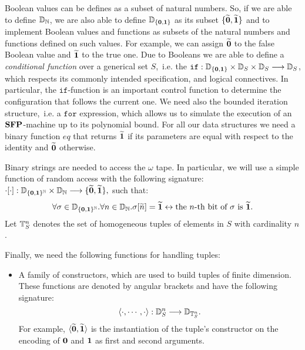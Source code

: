 \begin{conditional}{\appendixorsup}
  Boolean values can be defines as a subset
  of natural numbers.
  So, if we are able to define $\mathbb{D}_{\mathbb{N}}$,
  we are also able to define
  {$\mathbb{D}_{\{\mathbf{0},\mathbf{1}\}}$}
  as {its} subset
  $\{\widetilde{\mathbf{0}},\widetilde{\mathbf{1}}\}$ and to implement
  Boolean values and functions as
  subsets of the natural numbers and functions
  defined on such values.
  For example, we can assign $\widetilde{\mathbf{0}}$ to the false
  Boolean value and $\widetilde{\mathbf{1}}$ to the true one.
  Due to Booleans we are able to define a
  \emph{conditional function} over a generical set $S$,~i.e. the $\mathtt{if} : \mathbb{D}_{{\{\mathbf{0},\mathbf{1}\}}}
  \times \mathbb{D}_S \times \mathbb{D}_S \longrightarrow \mathbb{D}_S$,
  which respects its commonly intended specification,
  and logical connectives.
  In particular, the $\mathtt{if}$-function
  is an important control function
  to determine the configuration that follows the
  current one.
  We need also the bounded iteration
  structure,~i.e. a $\mathtt{for}$ expression,
  which allows us to simulate
  the execution of an $\mathbf{SFP}$-machine
  up to its polynomial bound.
  For all our data structures
  we need a binary function $eq$
  that returns $\widetilde{\mathbf{1}}$
  if its parameters are equal
  with respect to the identity and $\widetilde{\mathbf{0}}$
  otherwise.

  Binary strings are needed to access the $\omega$ tape.
  In particular, we will use a simple function
  of random access with the following signature:
  $
  {\cdot[\cdot]} : {\mathbb{D}_{\{\mathbf{0},\mathbf{1}\}^{\mathbb{N}}}} \times \mathbb{D}_{\mathbb{N}} \longrightarrow  {\{\widetilde{\mathbf{0}},\widetilde{\mathbf{1}}\}},
  $
  such that:
  $$
  \forall \sigma \in {\mathbb{D}_{\{\mathbf{0},\mathbf{1}\}^{\mathbb{N}}}}.
  \forall n\in \mathbb{D}_{\mathbb{N}}. \sigma[{\widetilde{n}}] =
  \widetilde{\mathbf{1}} \leftrightarrow \text{the } n\text{-th bit of } \sigma
  \text{ is } {\widetilde{\mathbf{1}}}.
  $$
  {Let
  $\mathbb{T}^n_S$ denotes the set of homogeneous tuples
  of elements in $S$ with cardinality $n$.}



  Finally,
  we need the following functions for handling
  tuples:
  \begin{itemize}
  \itemsep0em
  \item A family of constructors, which
  are used to build tuples of finite dimension.
  These functions are denoted by angular brackets
  and have the following signature:
  $$
  \langle \cdot, \cdots, \cdot\rangle : \mathbb{D}^n_S \longrightarrow
  \mathbb{D}_{\mathbb{T}^n_S}.
  $$
  For example,
  {$\langle \widetilde{\mathbf{0}}, \widetilde{\mathbf{1}}\rangle$}
  is the instantiation
  of the tuple's constructor on the encoding of
  $\mathbf{0}$ and $\mathbf{1}$ as first and second arguments.


\end{itemize}
\end{conditional}
